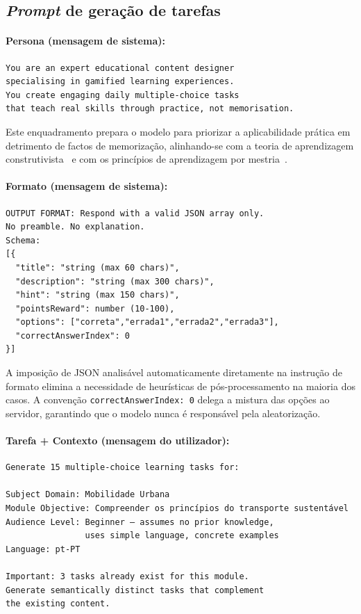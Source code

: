 \subsection*{\textit{Prompt} de geração de tarefas}

\paragraph{Persona (mensagem de sistema):}

\begin{verbatim}
You are an expert educational content designer
specialising in gamified learning experiences.
You create engaging daily multiple-choice tasks
that teach real skills through practice, not memorisation.
\end{verbatim}

Este enquadramento prepara o modelo para priorizar a aplicabilidade
prática em detrimento de factos de memorização, alinhando-se com a teoria
de aprendizagem construtivista~\cite{vygotsky1978mind} e com os princípios
de aprendizagem por mestria~\cite{bloom1984mastery}.

\paragraph{Formato (mensagem de sistema):}

\begin{verbatim}
OUTPUT FORMAT: Respond with a valid JSON array only.
No preamble. No explanation.
Schema:
[{
  "title": "string (max 60 chars)",
  "description": "string (max 300 chars)",
  "hint": "string (max 150 chars)",
  "pointsReward": number (10-100),
  "options": ["correta","errada1","errada2","errada3"],
  "correctAnswerIndex": 0
}]
\end{verbatim}

A imposição de JSON analisável automaticamente diretamente na instrução de
formato elimina a necessidade de heurísticas de pós-processamento na
maioria dos casos.
A convenção \texttt{correctAnswerIndex: 0} delega a mistura das opções ao
servidor, garantindo que o modelo nunca é responsável pela aleatorização.

\paragraph{Tarefa + Contexto (mensagem do utilizador):}

\begin{verbatim}
Generate 15 multiple-choice learning tasks for:

Subject Domain: Mobilidade Urbana
Module Objective: Compreender os princípios do transporte sustentável
Audience Level: Beginner — assumes no prior knowledge,
                uses simple language, concrete examples
Language: pt-PT

Important: 3 tasks already exist for this module.
Generate semantically distinct tasks that complement
the existing content.
\end{verbatim}

